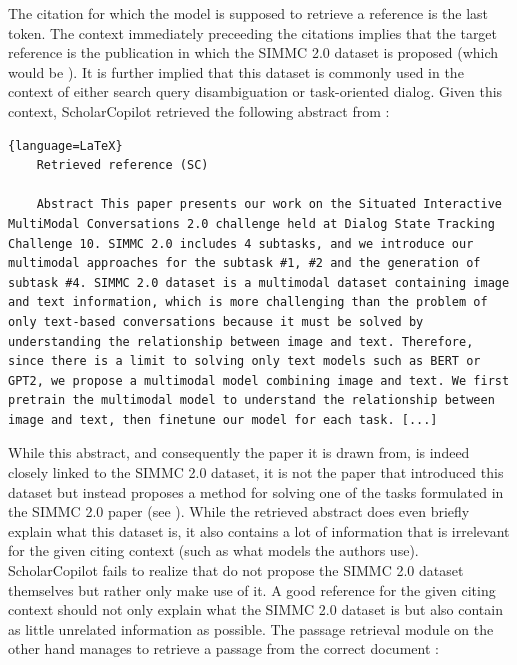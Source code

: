 The citation for which the model is supposed to retrieve a reference is the last  token. The context immediately preceeding the citations implies that the target reference is the publication in which the SIMMC 2.0 dataset is proposed (which would be \cite{kottur2021simmc}). It is further implied that this dataset is commonly used in the context of either search query disambiguation or task-oriented dialog. Given this context, ScholarCopilot retrieved the following abstract from \cite{lee2021multimodal}:
\begin{lstlisting}{language=LaTeX}
    Retrieved reference (SC)
    
    Abstract This paper presents our work on the Situated Interactive MultiModal Conversations 2.0 challenge held at Dialog State Tracking Challenge 10. SIMMC 2.0 includes 4 subtasks, and we introduce our multimodal approaches for the subtask #1, #2 and the generation of subtask #4. SIMMC 2.0 dataset is a multimodal dataset containing image and text information, which is more challenging than the problem of only text-based conversations because it must be solved by understanding the relationship between image and text. Therefore, since there is a limit to solving only text models such as BERT or GPT2, we propose a multimodal model combining image and text. We first pretrain the multimodal model to understand the relationship between image and text, then finetune our model for each task. [...]
\end{lstlisting}
While this abstract, and consequently the paper it is drawn from, is indeed closely linked to the SIMMC 2.0 dataset, it is not the paper that introduced this dataset but instead proposes a method for solving one of the tasks formulated in the SIMMC 2.0 paper (see \cite{lee2021multimodal,kottur2021simmc}). While the retrieved abstract does even briefly explain what this dataset is, it also contains a lot of information that is irrelevant for the given citing context (such as what models the authors use). ScholarCopilot fails to realize that \cite{lee2021multimodal} do not propose the SIMMC 2.0 dataset themselves but rather only make use of it. A good reference for the given citing context should not only explain what the SIMMC 2.0 dataset is but also contain as little unrelated information as possible. The passage retrieval module on the other hand manages to retrieve a passage from the correct document \cite{kottur2021simmc}:
